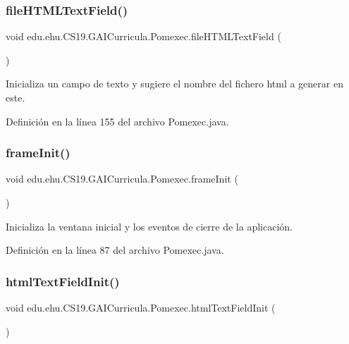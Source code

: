 \subsubsection{\texorpdfstring{fileHTMLTextField()}{fileHTMLTextField()}}
{\footnotesize\ttfamily void edu.\+ehu.\+C\+S19.\+G\+A\+I\+Curricula.\+Pomexec.\+file\+H\+T\+M\+L\+Text\+Field (\begin{DoxyParamCaption}{ }\end{DoxyParamCaption})}



Inicializa un campo de texto y sugiere el nombre del fichero html a generar en este. 



Definición en la línea 155 del archivo Pomexec.\+java.

\mbox{\label{a00029_a1542762d65badb0de4c9e00d793acd37}} 
\subsubsection{\texorpdfstring{frameInit()}{frameInit()}}
{\footnotesize\ttfamily void edu.\+ehu.\+C\+S19.\+G\+A\+I\+Curricula.\+Pomexec.\+frame\+Init (\begin{DoxyParamCaption}{ }\end{DoxyParamCaption})}



Inicializa la ventana inicial y los eventos de cierre de la aplicación. 



Definición en la línea 87 del archivo Pomexec.\+java.

\mbox{\label{a00029_aac5d95af4efdb3dc20e305283cedef95}} 
\subsubsection{\texorpdfstring{htmlTextFieldInit()}{htmlTextFieldInit()}}
{\footnotesize\ttfamily void edu.\+ehu.\+C\+S19.\+G\+A\+I\+Curricula.\+Pomexec.\+html\+Text\+Field\+Init (\begin{DoxyParamCaption}{ }\end{DoxyParamCaption})}



